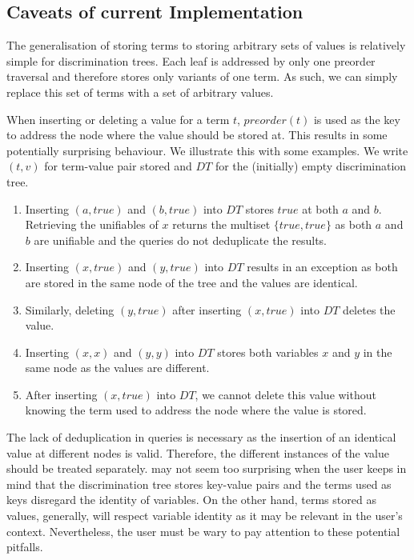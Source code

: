 \subsection{Caveats of current Implementation} \label{caveats}
The generalisation of storing terms to storing arbitrary sets of values is relatively simple for discrimination trees. Each leaf is addressed by only one preorder traversal and therefore stores only variants of one term. As such, we can simply replace this set of terms with a set of arbitrary values.

When inserting or deleting a value for a term $t$, $preorder(t)$ is used as the key to address the node where the value should be stored at. This results in some potentially surprising behaviour. We illustrate this with some examples. We write $(t, v)$ for term-value pair stored and $DT$ for the (initially) empty discrimination tree.

\begin{enumerate}
  \item \label{cave1} Inserting $(a,true)$ and $(b,true)$ into $DT$ stores $true$ at both $a$ and $b$. Retrieving the unifiables of $x$ returns the multiset $\{true, true\}$ as both $a$ and $b$ are unifiable and the queries do not deduplicate the results.
  \item \label{cave2} Inserting $(x,true)$ and $(y,true)$ into $DT$ results in an exception as both are stored in the same node of the tree and the values are identical.
  \item \label{cave4} Similarly, deleting $(y,true)$ after inserting $(x,true)$ into $DT$ deletes the value.
  \item \label{cave3} Inserting $(x,x)$ and $(y,y)$ into $DT$ stores both variables $x$ and $y$ in the same node as the values are different.
  \item \label{cave5} After inserting $(x,true)$ into $DT$, we cannot delete this value without knowing the term used to address the node where the value is stored.
\end{enumerate}

The lack of deduplication in queries is necessary as the insertion of an identical value at different nodes is valid. Therefore, the different instances of the value should be treated separately.
 may not seem too surprising when the user keeps in mind that the discrimination tree stores key-value pairs and the terms used as keys disregard the identity of variables. On the other hand, terms stored as values, generally, will respect variable identity as it may be relevant in the user's context. Nevertheless, the user must be wary to pay attention to these potential pitfalls.

